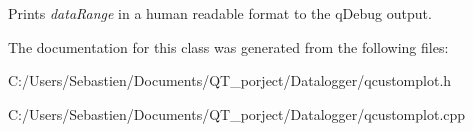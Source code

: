 Prints {\itshape data\+Range} in a human readable format to the q\+Debug output. 

The documentation for this class was generated from the following files\+:\begin{DoxyCompactItemize}
\item 
C\+:/\+Users/\+Sebastien/\+Documents/\+Q\+T\+\_\+porject/\+Datalogger/qcustomplot.\+h\item 
C\+:/\+Users/\+Sebastien/\+Documents/\+Q\+T\+\_\+porject/\+Datalogger/qcustomplot.\+cpp\end{DoxyCompactItemize}
